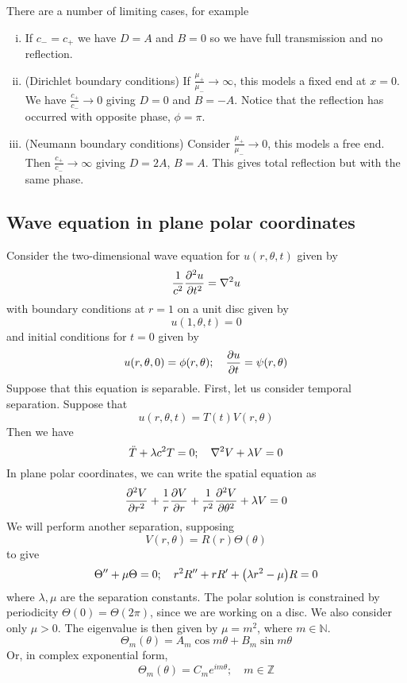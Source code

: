 There are a number of limiting cases, for example
\begin{enumerate}[(i)]
	\item If \( c_- = c_+ \) we have \( D = A \) and \( B = 0 \) so we have full transmission and no reflection.
	\item (Dirichlet boundary conditions) If \( \frac{\mu_+}{\mu_-} \to \infty \), this models a fixed end at \( x = 0 \).
	      We have \( \frac{c_+}{c_-} \to 0 \) giving \( D = 0 \) and \( B = -A \).
	      Notice that the reflection has occurred with opposite phase, \( \phi = \pi \).
	\item (Neumann boundary conditions) Consider \( \frac{\mu_+}{\mu_-} \to 0 \), this models a free end.
	      Then \( \frac{c_+}{c_-} \to \infty \) giving \( D = 2A \), \( B = A \).
	      This gives total reflection but with the same phase.
\end{enumerate}

\subsection{Wave equation in plane polar coordinates}
Consider the two-dimensional wave equation for \( u(r,\theta,t) \) given by
\[
	\frac{1}{c^2} \pdv[2]{u}{t} = \laplacian u
\]
with boundary conditions at \( r = 1 \) on a unit disc given by
\[
	u(1,\theta,t) = 0
\]
and initial conditions for \( t = 0 \) given by
\[
	u(r,\theta,0) = \phi(r,\theta);\quad \pdv{u}{t}(r,\theta,0) = \psi(r,\theta)
\]
Suppose that this equation is separable.
First, let us consider temporal separation.
Suppose that
\[
	u(r,\theta,t) = T(t) V(r,\theta)
\]
Then we have
\[
	\ddot T + \lambda c^2 T = 0;\quad \laplacian V + \lambda V = 0
\]
In plane polar coordinates, we can write the spatial equation as
\[
	\pdv[2]{V}{r} + \frac{1}{r} \pdv{V}{r} + \frac{1}{r^2}\pdv[2]{V}{\theta} + \lambda V = 0
\]
We will perform another separation, supposing
\[
	V(r,\theta) = R(r) \Theta(\theta)
\]
to give
\[
	\Theta'' + \mu \Theta = 0;\quad r^2 R'' + r R' + \qty(\lambda r^2 - \mu) R = 0
\]
where \( \lambda, \mu \) are the separation constants.
The polar solution is constrained by periodicity \( \Theta(0) = \Theta(2 \pi) \), since we are working on a disc.
We also consider only \( \mu > 0 \).
The eigenvalue is then given by \( \mu = m^2 \), where \( m \in \mathbb N \).
\[
	\Theta_m(\theta) = A_m \cos m \theta + B_m \sin m \theta
\]
Or, in complex exponential form,
\[
	\Theta_m(\theta) = C_m e^{im\theta};\quad m \in \mathbb Z
\]

